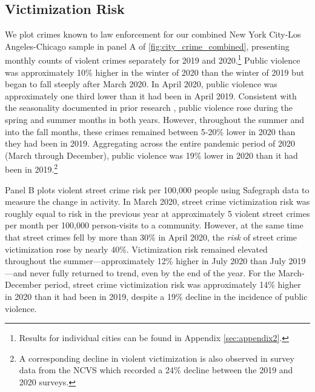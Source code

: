 \documentclass[12pt]{article}
\begin{document}
\subsection{Victimization Risk}
We plot crimes known to law enforcement for our combined New York City-Los Angeles-Chicago sample in panel A of \autoref{fig:city_crime_combined}, presenting monthly counts of violent crimes separately for 2019 and 2020.\footnote{Results for individual cities can be found in Appendix \ref{sec:appendix2}. %
} Public violence was approximately 10\% higher in the winter of 2020 than the winter of 2019 but began to fall steeply after March 2020. In April 2020, public violence was approximately one third lower than it had been in April 2019. Consistent with the seasonality documented in prior research \citep{andresen2013crime, jacob2007dynamics}, public violence rose during the spring and summer months in both years.  However, throughout the summer and into the fall months, these crimes remained between 5-20\% lower in 2020 than they had been in 2019. Aggregating across the entire pandemic period of 2020 (March through December), public violence was 19\% lower in 2020 than it had been in 2019.\footnote{A corresponding decline in violent victimization is also observed in survey data from the NCVS which recorded a 24\% decline between the 2019 and 2020 surveys.}

Panel B plots violent street crime risk per 100,000 people using Safegraph data to measure the change in activity. In March 2020, street crime victimization risk was roughly equal to risk in the previous year at approximately 5 violent street crimes per month per 100,000 person-visits to a community. %
However, at the same time that street crimes fell by more than 30\% in April 2020, the \emph{risk} of street crime victimization rose by nearly 40\%. Victimization risk remained elevated throughout the summer---approximately 12\% higher in July 2020 than July 2019---and never fully returned to trend, even by the end of the year. For the March-December period, street crime victimization risk was approximately 14\% higher in 2020 than it had been in 2019, despite a 19\% decline in the incidence of public violence. 
\end{document}
